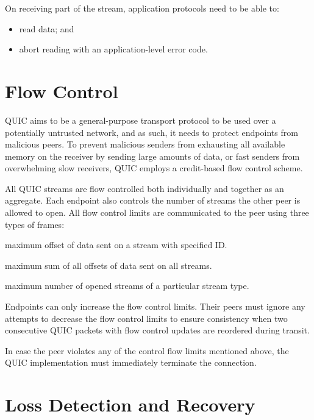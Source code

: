 On receiving part of the stream, application protocols need to be able to:

\begin{itemize}

  \item read data; and

  \item abort reading with an application-level error code.

\end{itemize}

\section{Flow Control}

QUIC aims to be a general-purpose transport protocol to be used over a potentially untrusted
network, and as such, it needs to protect endpoints from malicious peers. To prevent malicious
senders from exhausting all available memory on the receiver by sending large amounts of data, or
fast senders from overwhelming slow receivers, QUIC employs a credit-based flow control scheme.

All QUIC streams are flow controlled both individually and together as an aggregate. Each endpoint
also controls the number of streams the other peer is allowed to open. All flow control limits are
communicated to the peer using three types of frames:

\begin{itemize}

 maximum offset of data sent on a stream with specified ID\@.

 maximum sum of all offsets of data sent on all streams.

 maximum number of opened streams of a particular stream type.

\end{itemize}

Endpoints can only increase the flow control limits. Their peers must ignore any attempts to
decrease the flow control limits to ensure consistency when two consecutive QUIC packets with flow
control updates are reordered during transit.

In case the peer violates any of the control flow limits mentioned above, the QUIC implementation
must immediately terminate the connection.

\section{Loss Detection and Recovery}

